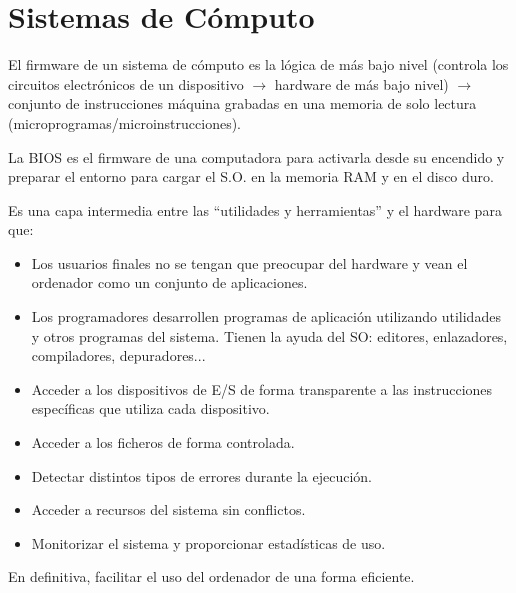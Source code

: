\chapter{Sistemas de Cómputo}
\begin{definicion}[Firmware]
    El firmware de un sistema de cómputo es la lógica de más bajo nivel (controla los circuitos electrónicos de un dispositivo $\longrightarrow$ hardware de más bajo nivel) $\longrightarrow$ conjunto de instrucciones máquina grabadas en una memoria de solo lectura (microprogramas/microinstrucciones).
\end{definicion}
\begin{definicion}[BIOS]
    La BIOS es el firmware de una computadora para activarla desde su encendido y preparar el entorno para cargar el S.O. en la memoria RAM y en el disco duro.    
\end{definicion}

\begin{definicion}
    Es una capa intermedia entre las ``utilidades y herramientas'' y el hardware para que:
    \begin{itemize}
        \item Los usuarios finales no se tengan que preocupar del hardware y vean el ordenador como un conjunto de aplicaciones.
        \item Los programadores desarrollen programas de aplicación utilizando utilidades y otros programas del sistema. Tienen la ayuda del SO: editores, enlazadores, compiladores, depuradores...
        \item Acceder a los dispositivos de E/S de forma transparente a las instrucciones específicas que utiliza cada dispositivo.
        \item Acceder a los ficheros de forma controlada.
        \item Detectar distintos tipos de errores durante la ejecución.
        \item Acceder a recursos del sistema sin conflictos.
        \item Monitorizar el sistema y proporcionar estadísticas de uso.
    \end{itemize}
    En definitiva, facilitar el uso del ordenador de una forma eficiente.
\end{definicion}

